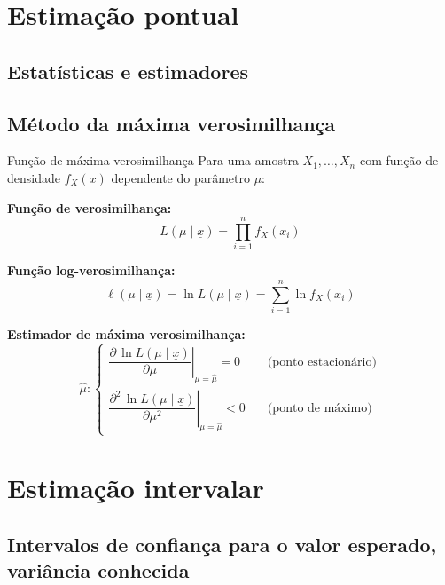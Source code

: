 \documentclass[a4paper,12pt]{article}
\begin{document}
\newpage

\section{\color{sectioncolor}Estimação pontual}
\subsection{Estatísticas e estimadores}

\subsection{Método da máxima verosimilhança}

\begin{formulabox}{Função de máxima verosimilhança}
Para uma amostra $X_1, \ldots, X_n$ com função de densidade $f_X(x)$ dependente do parâmetro $\mu$:

\textbf{Função de verosimilhança:}
\begin{equation}\label{formula23}\tag{Fórmula 23}
    L(\mu\mid \underline{x}) = \prod_{i=1}^n f_X(x_i)
\end{equation}

\textbf{Função log-verosimilhança:}
\begin{equation*}
    \ell(\mu\mid \underline{x}) = \ln L(\mu\mid \underline{x}) = \sum_{i=1}^n \ln f_X(x_i)
\end{equation*}

\textbf{Estimador de máxima verosimilhança:}
\[
    \hat{\mu} : 
    \begin{cases}
        \left. \dfrac{\partial\, \ln L(\mu \mid \underline{x})}{\partial \mu} \right|_{\mu = \hat{\mu}} = 0 \quad &\text{(ponto estacionário)} \\[2ex]
        \left. \dfrac{\partial^2\, \ln L(\mu \mid \underline{x})}{\partial \mu^2} \right|_{\mu = \hat{\mu}} < 0 \quad &\text{(ponto de máximo)}
    \end{cases}
\]
\end{formulabox}

\newpage

\section{\color{sectioncolor}Estimação intervalar}
\subsection{Intervalos de confiança para o valor esperado, variância conhecida}
\end{document}
